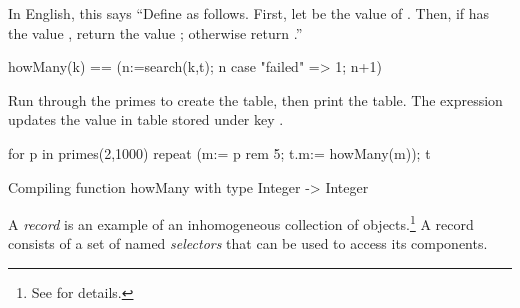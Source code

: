 {{{{{{{{\begin{xtc}
\begin{xtccomment}
In English, this says ``Define  as follows.
First, let  be the value of .
Then, if  has the value , return the value
; otherwise return .''
\end{xtccomment}
\begin{spadsrc}
howMany(k) == (n:=search(k,t); n case "failed" => 1; n+1)
\end{spadsrc}
\end{xtc}
\begin{xtc}
\begin{xtccomment}
Run through the primes to create the table, then print the table.
The expression  updates the value in table 
stored under key .
\end{xtccomment}
\begin{spadsrc}
for p in primes(2,1000) repeat (m:= p rem 5; t.m:= howMany(m)); t
\end{spadsrc}
\begin{MessageOutput}
   Compiling function howMany with type Integer -> Integer 
\end{MessageOutput}
\begin{TeXOutput}
\begin{fricasmath}{21}
%
\end{fricasmath}
\end{TeXOutput}
\end{xtc}

A {\it record}
is an example of an inhomogeneous collection
of objects.\footnote{See  for details.}
A record consists of a set of named {\it selectors} that
can be used to access its components.

}}}}}}}}
